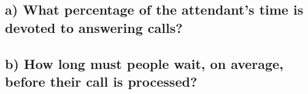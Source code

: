 \documentclass[
]{article}
\begin{document}
\hypertarget{a-what-percentage-of-the-attendants-time-is-devoted-to-answering-calls}{%
\subsection{a) What percentage of the attendant's time is devoted to
answering
calls?}\label{a-what-percentage-of-the-attendants-time-is-devoted-to-answering-calls}}

\hypertarget{b-how-long-must-people-wait-on-average-before-their-call-is-processed}{%
\subsection{b) How long must people wait, on average, before their call
is
processed?}\label{b-how-long-must-people-wait-on-average-before-their-call-is-processed}}
\end{document}
